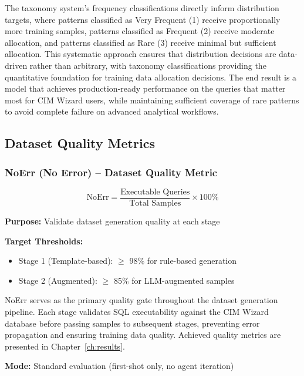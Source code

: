 The taxonomy system's frequency classifications directly inform distribution targets, where patterns classified as Very Frequent (1) receive proportionally more training samples, patterns classified as Frequent (2) receive moderate allocation, and patterns classified as Rare (3) receive minimal but sufficient allocation. This systematic approach ensures that distribution decisions are data-driven rather than arbitrary, with taxonomy classifications providing the quantitative foundation for training data allocation decisions. The end result is a model that achieves production-ready performance on the queries that matter most for CIM Wizard users, while maintaining sufficient coverage of rare patterns to avoid complete failure on advanced analytical workflows.


\subsection{Dataset Quality Metrics}
\label{subsec:dataset_quality_metrics}

\subsubsection{NoErr (No Error) -- Dataset Quality Metric}
\label{subsubsec:noerr}

\begin{equation}
\text{NoErr} = \frac{\text{Executable Queries}}{\text{Total Samples}} \times 100\%
\end{equation}

\textbf{Purpose:} Validate dataset generation quality at each stage

\textbf{Target Thresholds:}
\begin{itemize}[leftmargin=1.2em]
  \item Stage 1 (Template-based): $\geq$ 98\% for rule-based generation
  \item Stage 2 (Augmented): $\geq$ 85\% for LLM-augmented samples
\end{itemize}

NoErr serves as the primary quality gate throughout the dataset generation pipeline. Each stage validates SQL executability against the CIM Wizard database before passing samples to subsequent stages, preventing error propagation and ensuring training data quality. Achieved quality metrics are presented in Chapter~\ref{ch:results}.

\textbf{Mode:} Standard evaluation (first-shot only, no agent iteration)

